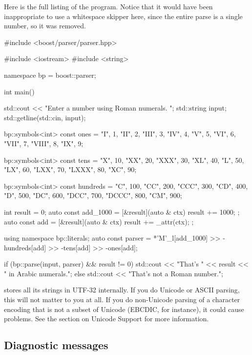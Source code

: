 \documentclass{MyBook}
\begin{document}
Here is the full listing of the program. Notice that it would have been inappropriate to use a whitespace skipper here, since the entire parse is a single number, so it was removed.

\begin{code}
#include <boost/parser/parser.hpp>

#include <iostream>
#include <string>


namespace bp = boost::parser;

int main()
{
    std::cout << "Enter a number using Roman numerals. ";
    std::string input;
    std::getline(std::cin, input);

    bp::symbols<int> const ones = {
        {"I", 1},
        {"II", 2},
        {"III", 3},
        {"IV", 4},
        {"V", 5},
        {"VI", 6},
        {"VII", 7},
        {"VIII", 8},
        {"IX", 9}};

    bp::symbols<int> const tens = {
        {"X", 10},
        {"XX", 20},
        {"XXX", 30},
        {"XL", 40},
        {"L", 50},
        {"LX", 60},
        {"LXX", 70},
        {"LXXX", 80},
        {"XC", 90}};

    bp::symbols<int> const hundreds = {
        {"C", 100},
        {"CC", 200},
        {"CCC", 300},
        {"CD", 400},
        {"D", 500},
        {"DC", 600},
        {"DCC", 700},
        {"DCCC", 800},
        {"CM", 900}};

    int result = 0;
    auto const add_1000 = [&result](auto & ctx) { result += 1000; };
    auto const add = [&result](auto & ctx) { result += _attr(ctx); };

    using namespace bp::literals;
    auto const parser =
        *'M'_l[add_1000] >> -hundreds[add] >> -tens[add] >> -ones[add];

    if (bp::parse(input, parser) && result != 0)
        std::cout << "That's " << result << " in Arabic numerals.\n";
    else
        std::cout << "That's not a Roman number.\n";
}
\end{code}

\begin{marker}[title=Important ]
 stores all its strings in UTF-32 internally. If you do Unicode or ASCII parsing, this will not matter to you at all. If you do non-Unicode parsing of a character encoding that is not a subset of Unicode (EBCDIC, for instance), it could cause problems. See the section on Unicode Support for more information. 
\end{marker}

\subsection{Diagnostic messages}
\end{document}
